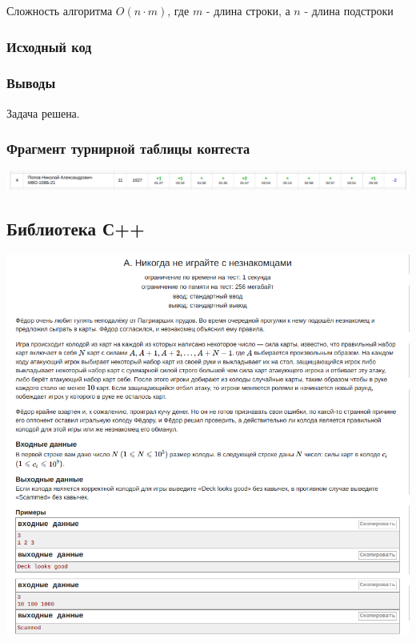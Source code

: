 Сложность алгоритма $O(n \cdot m)$, где $m$ - длина строки, а $n$ - длина подстроки

\subsubsection*{Исходный код}



\subsubsection*{Выводы}
Задача решена.

\subsubsection*{Фрагмент турнирной таблицы контеста}
\begin{center}
\includegraphics[width=\textwidth]{standings/Contest1.png}\newline\noindent
\end{center}


\subsection*{Библиотека С++}
\begin{center}
\includegraphics[width=\textwidth]{statements/Contest2A.png}
\end{center}

